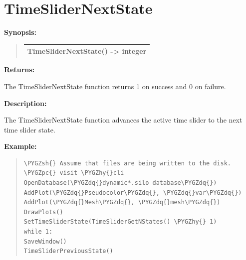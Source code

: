 \documentclass[letterpaper,10pt,english]{sphinxmanual}
\def\PYGZsh{\char`\#}
\def\PYGZpc{\char`\%}
\def\PYGZhy{\char`\-}
\def\PYGZdq{\char`\"}
\begin{document}
\section{TimeSliderNextState}
\label{functions:timeslidernextstate}
\begin{DUlineblock}{0em}
\item[] \textbf{Synopsis:}
\end{DUlineblock}
\begin{quote}

\begin{tabulary}{\linewidth}{|L|}
\hline

TimeSliderNextState() -\textgreater{} integer
\\
\hline\end{tabulary}

\end{quote}

\begin{DUlineblock}{0em}
\item[] 
\item[] \textbf{Returns:}
\item[] The TimeSliderNextState function returns 1 on success and 0 on failure.
\item[] 
\item[] \textbf{Description:}
\item[] The TimeSliderNextState function advances the active time slider to the
next time slider state.
\end{DUlineblock}

\begin{DUlineblock}{0em}
\item[] 
\end{DUlineblock}

\begin{DUlineblock}{0em}
\item[] \textbf{Example:}
\item[] 
\end{DUlineblock}
\begin{quote}

\begin{Verbatim}[commandchars=\\\{\}]
\PYGZsh{} Assume that files are being written to the disk.
\PYGZpc{} visit \PYGZhy{}cli
OpenDatabase(\PYGZdq{}dynamic*.silo database\PYGZdq{})
AddPlot(\PYGZdq{}Pseudocolor\PYGZdq{}, \PYGZdq{}var\PYGZdq{})
AddPlot(\PYGZdq{}Mesh\PYGZdq{}, \PYGZdq{}mesh\PYGZdq{})
DrawPlots()
SetTimeSliderState(TimeSliderGetNStates() \PYGZhy{} 1)
while 1:
SaveWindow()
TimeSliderPreviousState()
\end{Verbatim}
\end{quote}
\end{document}
